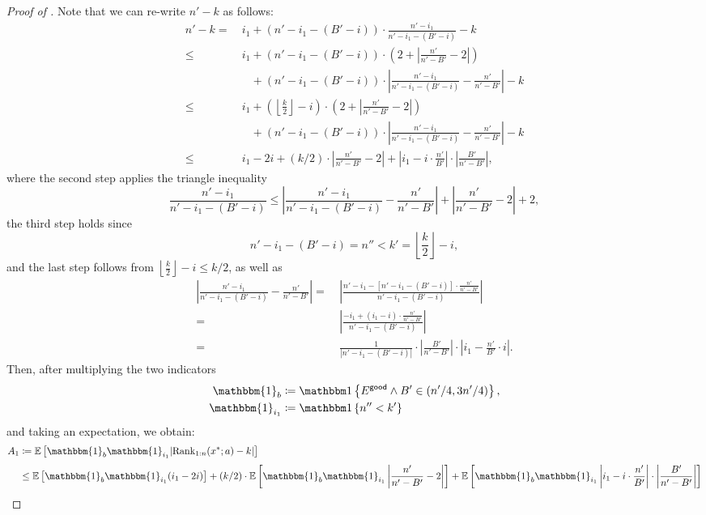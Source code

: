 \begin{proof}[Proof of ]
Note that we can re-write $n' - k$ as follows:
\begin{align*} 
    n' - k
=   &~i_1+\left(n'-i_1-(B'-i)\right)\cdot \frac{n'-i_1}{n'-i_1-(B'-i)}  - k\\
\le &~i_1+\left(n'-i_1-(B'-i)\right)\cdot \left(2 + \left|\frac{n'}{n'-B'}-2\right|\right)\\
&\quad + \left(n'-i_1-(B'-i)\right)\cdot \left|\frac{n'-i_1}{n'-i_1-(B'-i)} - \frac{n'}{n'-B'}\right|  - k\\
\le &~i_1+\left(\left\lfloor\frac{k}{2}\right\rfloor - i\right)\cdot \left(2 + \left|\frac{n'}{n'-B'}-2\right|\right)\\
&\quad + \left(n'-i_1-(B'-i)\right)\cdot \left|\frac{n'-i_1}{n'-i_1-(B'-i)} - \frac{n'}{n'-B'}\right|  - k\\
\le &~i_1 - 2i + (k/2)\cdot \left|\frac{n'}{n'-B'}-2\right| + \left|i_1 - i\cdot \frac{n'}{B'}\right|\cdot \left| \frac{B'}{n'-B'}\right|,
\end{align*}
where the second step applies the triangle inequality
\[
    \frac{n'-i_1}{n'-i_1-(B'-i)}
\le \left|\frac{n'-i_1}{n'-i_1-(B'-i)} - \frac{n'}{n'-B'}\right| + \left|\frac{n'}{n'-B'}-2\right| + 2,
\]
the third step holds since 
\[
    n'-i_1-(B'-i)
=   n''
<   k'
=   \left\lfloor\frac{k}{2}\right\rfloor - i,
\]
and the last step follows from $\left\lfloor\frac{k}{2}\right\rfloor - i \le k/2$, as well as
\begin{align*}
    \left|\frac{n'-i_1}{n'-i_1-(B'-i)} - \frac{n'}{n'-B'}\right|
=   &~\left|\frac{n'-i_1 - [n'-i_1-(B'-i)]\cdot \frac{n'}{n'-B'}}{n'-i_1-(B'-i)}\right| \\
=   &~\left|\frac{-i_1 + (i_1-i)\cdot \frac{n'}{n'-B'}}{n'-i_1-(B'-i)}\right| \\
=   &~ \frac{1}{|n'-i_1-(B'-i)|}\cdot\left| \frac{B'}{n'-B'}\right|\cdot \left|i_1 - \frac{n'}{B'}\cdot i\right|.
\end{align*}
Then, after multiplying the two indicators
\begin{align*}
   \mathbbm{1}_{b}&\coloneqq \1{\goodevent \wedge B' \in (n'/4, 3n'/4)},\\
\mathbbm{1}_{i_1}& \coloneqq  \1{n'' < k'}
\end{align*}
and taking an expectation, we obtain:
\begin{align*}
            A_1
&\coloneqq  \Ex{}{\mathbbm{1}_{b}\mathbbm{1}_{i_1}|\rank_{1:n}(x^*; a) - k|}\\
&\le        \Ex{}{\mathbbm{1}_{b}\mathbbm{1}_{i_1}(i_1 - 2i)} + (k/2)\cdot \Ex{}{\mathbbm{1}_{b}\mathbbm{1}_{i_1}\left|\frac{n'}{n'-B'}-2\right|} + \Ex{}{\mathbbm{1}_{b}\mathbbm{1}_{i_1}\left|i_1 - i\cdot \frac{n'}{B'}\right|\cdot \left| \frac{B'}{n'-B'}\right|}\\

\end{align*}
\end{proof}
